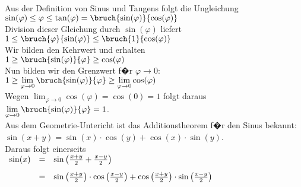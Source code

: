 \begin{enumerate}
      Aus der Definition von Sinus und Tangens folgt die Ungleichung 
      \\[0.3cm]
      \hspace*{1.3cm}
      $\sin(\varphi) \leq \varphi \leq \tan(\varphi) = \bruch{\sin(\varphi)}{\cos(\varphi)}$
      \\[0.3cm]
      Division dieser Gleichung durch $\sin(\varphi)$ liefert
      \\[0.3cm]
      \hspace*{1.3cm}
      $1 \leq \bruch{\varphi}{\sin(\varphi)} \leq \bruch{1}{\cos(\varphi)}$
      \\[0.3cm]
      Wir bilden den Kehrwert und erhalten
      \\[0.3cm]
      \hspace*{1.3cm}
      $1 \geq \bruch{\sin(\varphi)}{\varphi} \geq \cos(\varphi)$
      \\[0.3cm]
      Nun bilden wir den Grenzwert f�r $\varphi \rightarrow 0$:
      \\[0.3cm]
      \hspace*{1.3cm}
      $1 \geq \lim\limits_{\varphi \rightarrow 0} \bruch{\sin(\varphi)}{\varphi} \geq \lim\limits_{\varphi \rightarrow 0}\cos(\varphi)$
      \\[0.3cm]
      Wegen $\lim_{\varphi \rightarrow 0} \cos(\varphi) = \cos(0) = 1$ folgt daraus
      \\[0.3cm]
      \hspace*{1.3cm}
      $\lim\limits_{\varphi \rightarrow 0} \bruch{\sin(\varphi)}{\varphi} = 1$.
      \\[0.3cm]
       Aus dem Geometrie-Untericht ist das Additionstheorem f�r den Sinus 
       bekannt: 
       \\[0.3cm]
       \hspace*{1.3cm} $\sin(x+y) = \sin(x) \cdot \cos(y) + \cos(x) \cdot \sin(y)$.
         \\[0.2cm]
       Daraus folgt einerseits
       \\[0.3cm]
       \hspace*{1.3cm}
       $
       \begin{array}[t]{lcl}
         \sin(x) & = & \sin\left(\frac{x + y}{2} + \frac{x - y}{2}\right) \\[0.3cm]
                 & = & \sin\left(\frac{x + y}{2}\right)\cdot \cos\left(\frac{x - y}{2}\right) + \cos\left(\frac{x + y}{2}\right)\cdot \sin\left(\frac{x - y}{2}\right) 
       \end{array}
       $
       \\[0.3cm]

\end{enumerate}
